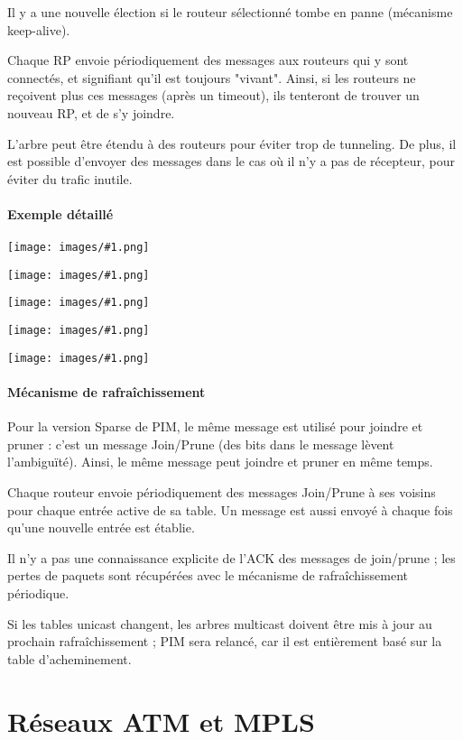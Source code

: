 \documentclass[10pt,a4paper]{report}
\newcommand{\dessin}[1]{\begin{center}\texttt{[image: images/\#1.png]}\end{center}}
\begin{document}
			
		Il y a une nouvelle élection si le routeur sélectionné tombe en panne (mécanisme keep-alive).
		
		Chaque RP envoie périodiquement des messages aux routeurs qui y sont connectés, et signifiant qu'il est toujours "vivant". Ainsi, si les routeurs ne reçoivent plus ces messages (après un timeout), ils tenteront de trouver un nouveau RP, et de s'y joindre.
		
		
		L'arbre peut être étendu à des routeurs pour éviter trop de tunneling. De plus, il est possible d'envoyer des messages dans le cas où il n'y a pas de récepteur, pour éviter du trafic inutile.
		
		\subsubsection{Exemple détaillé}
				
		\dessin{139}
		
		\dessin{140}
		
		\dessin{141}
		
		\dessin{142}
		
		\dessin{143}
		
		\subsubsection{Mécanisme de rafraîchissement}
		
		Pour la version Sparse de PIM, le même message est utilisé pour joindre et pruner : c'est un message Join/Prune (des bits dans le message lèvent l'ambiguïté). Ainsi, le même message peut joindre et pruner en même temps.
		
		Chaque routeur envoie périodiquement des messages Join/Prune à ses voisins pour chaque entrée active de sa table. Un message est aussi envoyé à chaque fois qu'une nouvelle entrée est établie.
		
		Il n'y a pas une connaissance explicite de l'ACK des messages de join/prune ; les pertes de paquets sont récupérées avec le mécanisme de rafraîchissement périodique.
		
		Si les tables unicast changent, les arbres multicast doivent être mis à jour au prochain rafraîchissement ; PIM sera relancé, car il est entièrement basé sur la table d'acheminement.
		
\chapter{Réseaux ATM et MPLS}
	
\end{document}

